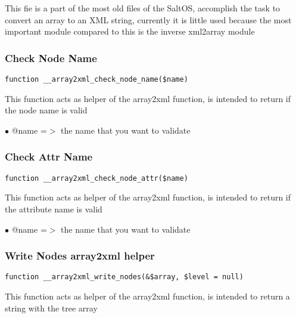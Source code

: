 \documentclass[a4paper]{article}
\begin{document}
This fie is a part of the most old files of the SaltOS, accomplish the task to convert an array
to an XML string, currently it is little used because the most important module compared to this
is the inverse xml2array module

\hypertarget{toc368}{}
\subsubsection{Check Node Name}

\begin{lstlisting}
function __array2xml_check_node_name($name)
\end{lstlisting}

This function acts as helper of the array2xml function, is intended to
return if the node name is valid

\begin{compactitem}
\item[\color{myblue}$\bullet$] @name =$>$ the name that you want to validate
\end{compactitem}

\hypertarget{toc369}{}
\subsubsection{Check Attr Name}

\begin{lstlisting}
function __array2xml_check_node_attr($name)
\end{lstlisting}

This function acts as helper of the array2xml function, is intended to
return if the attribute name is valid

\begin{compactitem}
\item[\color{myblue}$\bullet$] @name =$>$ the name that you want to validate
\end{compactitem}

\hypertarget{toc370}{}
\subsubsection{Write Nodes array2xml helper}

\begin{lstlisting}
function __array2xml_write_nodes(&$array, $level = null)
\end{lstlisting}

This function acts as helper of the array2xml function, is intended to
return a string with the tree array
\end{document}
